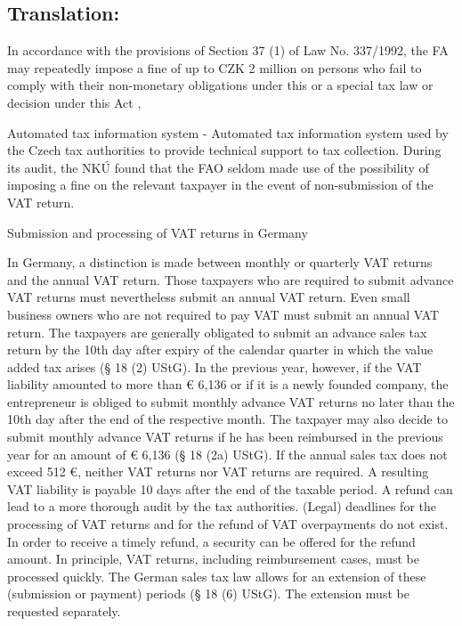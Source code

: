 \documentclass[10pt]{article}
\begin{document}
\pagebreak

\subsection*{Translation:}



In accordance with the provisions of Section 37 (1) of Law No. 337/1992, the FA may repeatedly impose a fine of up to CZK 2 million on persons who fail to comply with their non-monetary obligations under this or a special tax law or decision under this Act ,

Automated tax information system - Automated tax information system used by the Czech tax authorities to provide technical support to tax collection.
During its audit, the NKÚ found that the FAO seldom made use of the possibility of imposing a fine on the relevant taxpayer in the event of non-submission of the VAT return.


Submission and processing of VAT returns in Germany

In Germany, a distinction is made between monthly or quarterly VAT returns and the annual VAT return.
Those taxpayers who are required to submit advance VAT returns must nevertheless submit an annual VAT return.
Even small business owners who are not required to pay VAT must submit an annual VAT return.
The taxpayers are generally obligated to submit an advance sales tax return by the 10th day after expiry of the calendar quarter in which the value added tax arises (§ 18 (2) UStG).
In the previous year, however, if the VAT liability amounted to more than € 6,136 or if it is a newly founded company, the entrepreneur is obliged to submit monthly advance VAT returns no later than the 10th day after the end of the respective month.
The taxpayer may also decide to submit monthly advance VAT returns if he has been reimbursed in the previous year for an amount of € 6,136 (§ 18 (2a) UStG).
If the annual sales tax does not exceed 512 €, neither VAT returns nor VAT returns are required.
A resulting VAT liability is payable 10 days after the end of the taxable period.
A refund can lead to a more thorough audit by the tax authorities.
(Legal) deadlines for the processing of VAT returns and for the refund of VAT overpayments do not exist.
In order to receive a timely refund, a security can be offered for the refund amount.
In principle, VAT returns, including reimbursement cases, must be processed quickly.
The German sales tax law allows for an extension of these (submission or payment) periods (§ 18 (6) UStG).
The extension must be requested separately.
\end{document}
